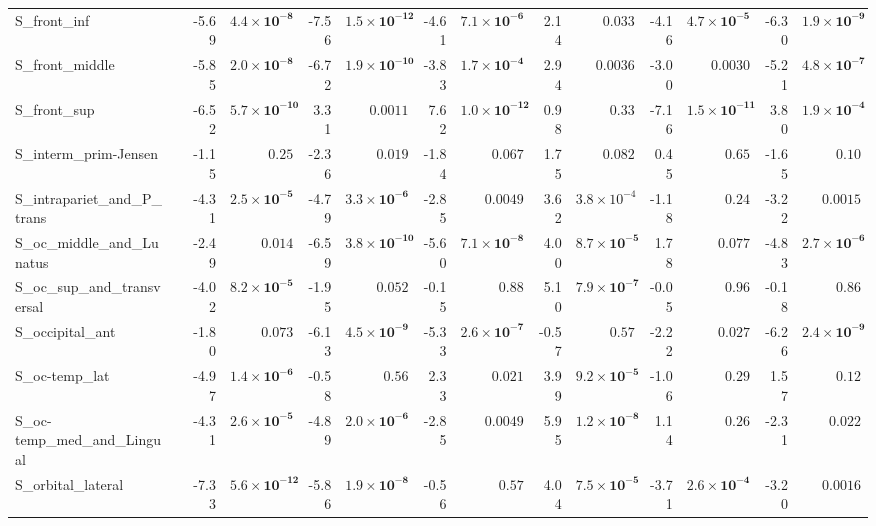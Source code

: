 {\begin{longtable}{llrrrrrrrrrrrr}
S\_front\_inf &  & -5.69 & $\mathbf{4.4{\times}10^{-8}}$ & -7.56 & $\mathbf{1.5{\times}10^{-12}}$ & -4.61 & $\mathbf{7.1{\times}10^{-6}}$ & 2.14 & $0.033$ & -4.16 & $\mathbf{4.7{\times}10^{-5}}$ & -6.30 & $\mathbf{1.9{\times}10^{-9}}$ \\
S\_front\_middle &  & -5.85 & $\mathbf{2.0{\times}10^{-8}}$ & -6.72 & $\mathbf{1.9{\times}10^{-10}}$ & -3.83 & $\mathbf{1.7{\times}10^{-4}}$ & 2.94 & $0.0036$ & -3.00 & $0.0030$ & -5.21 & $\mathbf{4.8{\times}10^{-7}}$ \\
S\_front\_sup &  & -6.52 & $\mathbf{5.7{\times}10^{-10}}$ & 3.31 & $0.0011$ & 7.62 & $\mathbf{1.0{\times}10^{-12}}$ & 0.98 & $0.33$ & -7.16 & $\mathbf{1.5{\times}10^{-11}}$ & 3.80 & $\mathbf{1.9{\times}10^{-4}}$ \\
S\_interm\_prim-Jensen &  & -1.15 & $0.25$ & -2.36 & $0.019$ & -1.84 & $0.067$ & 1.75 & $0.082$ & 0.45 & $0.65$ & -1.65 & $0.10$ \\
S\_intrapariet\_and\_P\_trans &  & -4.31 & $\mathbf{2.5{\times}10^{-5}}$ & -4.79 & $\mathbf{3.3{\times}10^{-6}}$ & -2.85 & $0.0049$ & 3.62 & $3.8{\times}10^{-4}$ & -1.18 & $0.24$ & -3.22 & $0.0015$ \\
S\_oc\_middle\_and\_Lunatus &  & -2.49 & $0.014$ & -6.59 & $\mathbf{3.8{\times}10^{-10}}$ & -5.60 & $\mathbf{7.1{\times}10^{-8}}$ & 4.00 & $\mathbf{8.7{\times}10^{-5}}$ & 1.78 & $0.077$ & -4.83 & $\mathbf{2.7{\times}10^{-6}}$ \\
S\_oc\_sup\_and\_transversal &  & -4.02 & $\mathbf{8.2{\times}10^{-5}}$ & -1.95 & $0.052$ & -0.15 & $0.88$ & 5.10 & $\mathbf{7.9{\times}10^{-7}}$ & -0.05 & $0.96$ & -0.18 & $0.86$ \\
S\_occipital\_ant &  & -1.80 & $0.073$ & -6.13 & $\mathbf{4.5{\times}10^{-9}}$ & -5.33 & $\mathbf{2.6{\times}10^{-7}}$ & -0.57 & $0.57$ & -2.22 & $0.027$ & -6.26 & $\mathbf{2.4{\times}10^{-9}}$ \\
S\_oc-temp\_lat &  & -4.97 & $\mathbf{1.4{\times}10^{-6}}$ & -0.58 & $0.56$ & 2.33 & $0.021$ & 3.99 & $\mathbf{9.2{\times}10^{-5}}$ & -1.06 & $0.29$ & 1.57 & $0.12$ \\
S\_oc-temp\_med\_and\_Lingual &  & -4.31 & $\mathbf{2.6{\times}10^{-5}}$ & -4.89 & $\mathbf{2.0{\times}10^{-6}}$ & -2.85 & $0.0049$ & 5.95 & $\mathbf{1.2{\times}10^{-8}}$ & 1.14 & $0.26$ & -2.31 & $0.022$ \\
S\_orbital\_lateral &  & -7.33 & $\mathbf{5.6{\times}10^{-12}}$ & -5.86 & $\mathbf{1.9{\times}10^{-8}}$ & -0.56 & $0.57$ & 4.04 & $\mathbf{7.5{\times}10^{-5}}$ & -3.71 & $\mathbf{2.6{\times}10^{-4}}$ & -3.20 & $0.0016$ \\

\end{longtable}}
